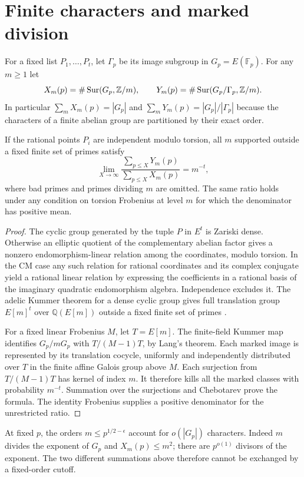 \documentclass[11pt]{article}
\newcommand{\Q}{\mathbb Q}\newcommand{\Z}{\mathbb Z}\newcommand{\F}{\mathbb F}
\begin{document}
\section{Finite characters and marked division}
For a fixed list $P_1,\ldots,P_t$, let $\Gamma_p$ be its image subgroup in $G_p=E(\F_p)$. For any $m\ge1$ let
\[
 X_m(p)=\#\Sur(G_p,\Z/m),\qquad
 Y_m(p)=\#\Sur(G_p/\Gamma_p,\Z/m).
\]
In particular $\sum_m X_m(p)=|G_p|$ and $\sum_mY_m(p)=|G_p|/|\Gamma_p|$ because the characters of a finite abelian group are partitioned by their exact order.
\begin{prop}
If the rational points $P_i$ are independent modulo torsion, all $m$ supported outside a fixed finite set of primes satisfy
\[
 \lim_{X\to\infty}\frac{\sum_{p\le X}Y_m(p)}{\sum_{p\le X}X_m(p)}
 =m^{-t},
\]
where bad primes and primes dividing $m$ are omitted. The same ratio holds under any condition on torsion Frobenius at level $m$ for which the denominator has positive mean.
\end{prop}
\begin{proof}
The cyclic group generated by the tuple $P$ in $E^t$ is Zariski dense. Otherwise an elliptic quotient of the complementary abelian factor gives a nonzero endomorphism-linear relation among the coordinates, modulo torsion. In the CM case any such relation for rational coordinates and its complex conjugate yield a rational linear relation by expressing the coefficients in a rational basis of the imaginary quadratic endomorphism algebra. Independence excludes it. The adelic Kummer theorem for a dense cyclic group gives full translation group $E[m]^t$ over $\Q(E[m])$ outside a fixed finite set of primes \cite[Theorem 6.9 and Corollary 6.11]{CDJLZ}.

For a fixed linear Frobenius $M$, let $T=E[m]$. The finite-field Kummer map identifies $G_p/mG_p$ with $T/(M-1)T$, by Lang's theorem. Each marked image is represented by its translation cocycle, uniformly and independently distributed over $T$ in the finite affine Galois group above $M$. Each surjection from $T/(M-1)T$ has kernel of index $m$. It therefore kills all the marked classes with probability $m^{-t}$. Summation over the surjections and Chebotarev prove the formula. The identity Frobenius supplies a positive denominator for the unrestricted ratio.
\end{proof}
At fixed $p$, the orders $m\le p^{1/2-\epsilon}$ account for $o(|G_p|)$ characters. Indeed $m$ divides the exponent of $G_p$ and $X_m(p)\le m^2$; there are $p^{o(1)}$ divisors of the exponent. The two different summations above therefore cannot be exchanged by a fixed-order cutoff.
\end{document}
